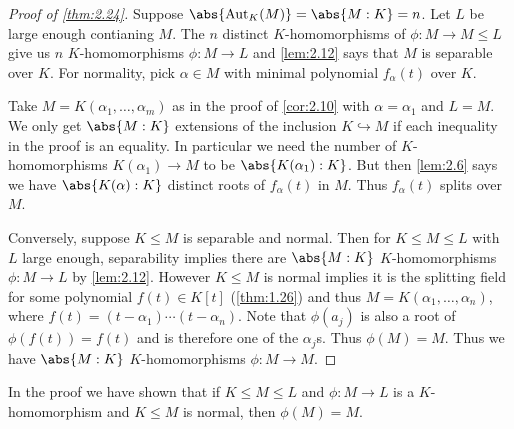 \documentclass{article}
\DeclareMathOperator{\Aut}{Aut}
\begin{document}
\begin{proof}[Proof of \cref{thm:2.24}]
    Suppose $\abs{\Aut_K(M)} = \abs{M:K} = n$. Let $L$ be large enough contianing $M$.
    The $n$ distinct $K$-homomorphisms of $\phi: M \to M \leq L$ give us $n$ $K$-homomorphisms $\phi:M \to L$ and \cref{lem:2.12} says that $M$ is separable over $K$.
    For normality, pick $\alpha \in M$ with minimal polynomial $f_\alpha(t)$ over $K$.

    Take $M = K(\alpha_1, \dotsc, \alpha_m)$ as in the proof of \cref{cor:2.10} with $\alpha = \alpha_1$ and $L = M$.
    We only get $\abs{M:K}$ extensions of the inclusion $K \hookrightarrow M$ if each inequality in the proof is an equality.
    In particular we need the number of $K$-homomorphisms $K(\alpha_1) \to M$ to be $\abs{K(\alpha_1):K}$.
    But then \cref{lem:2.6} says we have $\abs{K(\alpha):K}$ distinct roots of $f_\alpha(t)$ in $M$.
    Thus $f_\alpha(t)$ splits over $M$.


    Conversely, suppose $K \leq M$ is separable and normal.
    Then for $K \leq M \leq L$ with $L$ large enough, separability implies there are $\abs{M:K}$ $K$-homomorphisms $\phi:M \to L$ by \cref{lem:2.12}.
    However $K \leq M$ is normal implies it is the splitting field for some polynomial $f(t) \in K[t]$ (\cref{thm:1.26}) and thus $M = K(\alpha_1, \dotsc, \alpha_n)$, where $f(t) = (t - \alpha_1) \dotsm (t - \alpha_n)$.
    Note that $\phi(a_j)$ is also a root of $\phi(f(t)) = f(t)$ and is therefore one of the $\alpha_j$s.
    Thus $\phi(M) = M$. Thus we have $\abs{M:K}$ $K$-homomorphisms $\phi:M \to M$.
\end{proof}

\begin{remark}\label{rem:2.27}
    In the proof we have shown that if $K \leq M \leq L$ and $\phi:M \to L$ is a $K$-homomorphism and $K \leq M$ is normal, then $\phi(M) = M$.
\end{remark}
\end{document}
